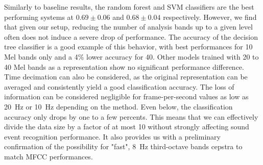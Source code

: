 \documentclass[sensors,article,submit,moreauthors,pdftex,10pt,a4paper]{mdpi}
\begin{document}
Similarly to baseline results, the random forest and SVM classifiers are the best performing systems at $0.69\pm 0.06$ and $0.68\pm 0.04$ respectively. However, we find that given our setup, reducing the number of analysis bands up to a given level often does not induce a severe drop of performance. The accuracy of the decision tree classifier is a good example of this behavior, with best performances for 10 Mel bands only and a 4\% lower accuracy for 40. Other models trained with 20 to 40 Mel bands as a representation show no significant performance difference. Time decimation can also be considered, as the original representation can be averaged and consistently yield a good classification accuracy. The loss of information can be considered negligible for frame-per-second values as low as 20~Hz or 10~Hz depending on the method. Even below, the classification accuracy only drops by one to a few percents. This means that we can effectively divide the data size by a factor of at most 10 without strongly affecting sound event recognition performance. It also provides us with a preliminary confirmation of the possibility for "fast", 8~Hz third-octave bands cepstra to match MFCC performances.\\
\end{document}
